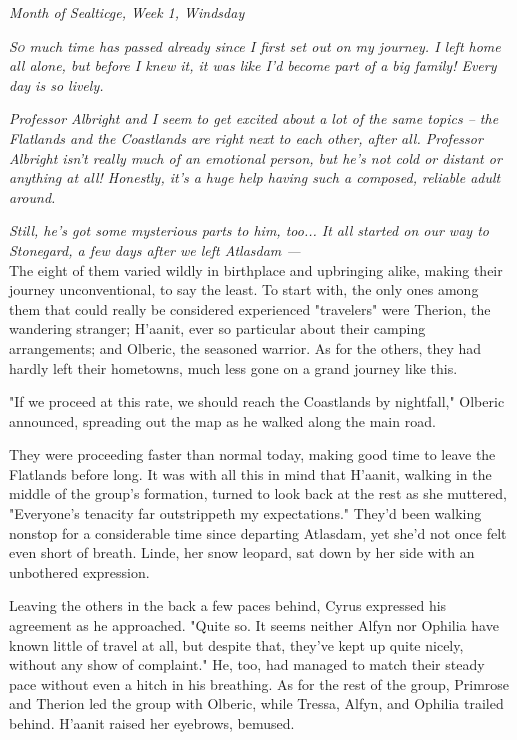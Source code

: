 \begin{flushright}\emph{Month of Sealticge, Week 1, Windsday}\end{flushright}


\emph{\textsc{So} much time has passed already since I first set out on my journey. I left home all alone, but before I knew it, it was like I'd become part of a big family! Every day is so lively.}

\emph{Professor Albright and I seem to get excited about a lot of the same topics -- the Flatlands and the Coastlands are right next to each other, after all. Professor Albright isn't really much of an emotional person, but he's not cold or distant or anything at all! Honestly, it's a huge help having such a composed, reliable adult around.}

\emph{Still, he's got some mysterious parts to him, too... It all started on our way to Stonegard, a few days after we left Atlasdam ---} 
\\

 The eight of them varied wildly in birthplace and upbringing alike, making their journey unconventional, to say the least. To start with, the only ones among them that could really be considered experienced "travelers" were Therion, the wandering stranger; H'aanit, ever so particular about their camping arrangements; and Olberic, the seasoned warrior. As for the others, they had hardly left their hometowns, much less gone on a grand journey like this. 

"If we proceed at this rate, we should reach the Coastlands by nightfall," Olberic announced, spreading out the map as he walked along the main road.

They were proceeding faster than normal today, making good time to leave the Flatlands before long. It was with all this in mind that H'aanit, walking in the middle of the group's formation, turned to look back at the rest as she muttered, "Everyone's tenacity far outstrippeth my expectations." They'd been walking nonstop for a considerable time since departing Atlasdam, yet she'd not once felt even short of breath. Linde, her snow leopard, sat down by her side with an unbothered expression.

Leaving the others in the back a few paces behind, Cyrus expressed his agreement as he approached. "Quite so. It seems neither Alfyn nor Ophilia have known little of travel at all, but despite that, they've kept up quite nicely, without any show of complaint."  He, too, had managed to match their steady pace without even a hitch in his breathing. As for the rest of the group, Primrose and Therion led the group with Olberic, while Tressa, Alfyn, and Ophilia trailed behind. H'aanit raised her eyebrows, bemused.

